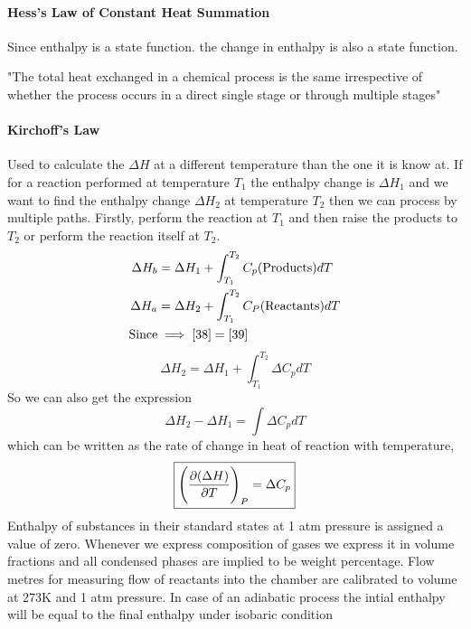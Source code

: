 \documentclass[12pt]{article}
\begin{document}
    \paragraph{Hess's Law of Constant Heat Summation}
    Since enthalpy is a state function. the change in enthalpy is also a state function. 
    \begin{center}
    	{\color{blue}"The total heat exchanged in a chemical process is the same irrespective of whether the process occurs in a direct single stage or through multiple stages"}
    \end{center}
    
    \paragraph{Kirchoff's Law}
    Used to calculate the $\Delta H$ at a different temperature than the one it is know at. If for a reaction performed at temperature $T_1$ the enthalpy change is $\Delta H_1$ and we want to find the enthalpy change $\Delta H_2$ at temperature $T_2$ then we can process by multiple paths. Firstly, perform the reaction at $T_1$ and then raise the products to $T_2$ 
    or perform the reaction itself at $T_2$. 
\begin{align}
    	\Delta H_b&=\Delta H_1 +\int_{T_1}^{T_2}C_p(\text{Products})dT \label{38}\\
    	\Delta H_a&=\Delta H_2 + \int_{T_1}^{T_2}C_P(\text{Reactants})dT \label{39} \\
 \text{Since}&\implies  \eqref{38}=\eqref{39} \\
\end{align}
\begin{equation}
	\boxed {\Delta H_2=\Delta H_1 + \int_{T_1}^{T_2}\Delta C_pdT}  
\end{equation}
  So we can also get the expression $$\Delta H_2-\Delta H_1=\int \Delta C_pdT$$ which can be written as the rate of change in heat of reaction with temperature,
  \begin{equation}
  	\boxed{\Bigg(\pdv{(\Delta H)}{T}\Bigg)_P=\Delta C_p}
  \end{equation}
Enthalpy of substances in their standard states at 1 atm pressure is assigned a value of zero. Whenever we express composition of gases we express it in volume fractions and all condensed phases are implied to be weight percentage. Flow metres for measuring flow of reactants into the chamber are calibrated to volume at 273K and 1 atm pressure. In case of an adiabatic process the intial enthalpy will be equal to the final enthalpy under isobaric condition
\end{document}
